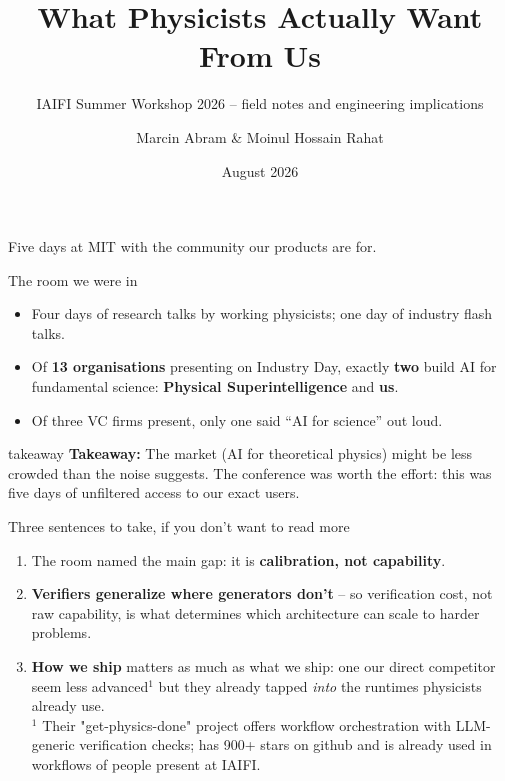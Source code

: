 \documentclass[aspectratio=169,11pt]{beamer}
\title{\textbf{What Physicists Actually Want From Us}}
\subtitle{IAIFI Summer Workshop 2026 -- field notes and engineering implications}
\author{Marcin Abram \& Moinul Hossain Rahat}
\institute{FirstPrinciples}
\date{August 2026}
\newcommand{\takeaway}[1]{%
  \vfill
  \begin{beamercolorbox}[wd=\textwidth,sep=0.45em]{takeaway}
    \small\textbf{Takeaway:} #1
  \end{beamercolorbox}%
}
\newcommand{\lead}[1]{\textcolor{fpaccent}{\textbf{#1}}}
\newcommand{\src}[1]{{\color{fpgray}\scriptsize #1}}
\begin{document}
\begin{frame}[plain]
  \titlepage
  \begin{center}
    \src{Five days at MIT with the community our products are for.}
  \end{center}
\end{frame}

\begin{frame}{The room we were in}
  \begin{itemize}\setlength\itemsep{0.7em}
    \item Four days of research talks by working physicists; one day of industry flash talks.
    \item Of \textbf{13 organisations} presenting on Industry Day, exactly \textbf{two} build AI for fundamental science: \textbf{Physical Superintelligence} and \textbf{us}.
    \item Of three VC firms present, only one said ``AI for science'' out loud.
  \end{itemize}
  \takeaway{The market (AI for theoretical physics) might be less crowded than the noise suggests. The conference was worth the effort: this was five days of unfiltered access to our exact users.}
\end{frame}

\begin{frame}{Three sentences to take, if you don't want to read more}
  \begin{enumerate}\setlength\itemsep{1.0em}
    \item The room named the main gap: it is \lead{calibration, not capability}.
    \item \lead{Verifiers generalize where generators don't} -- so verification cost, not raw capability, is what determines which architecture can scale to harder problems.
    \item \lead{How we ship} matters as much as what we ship: one our direct competitor seem less advanced$^1$ but they already tapped \emph{into} the runtimes physicists already use.\\[24pt]
    {\footnotesize $^1$ Their "get-physics-done" project offers workflow orchestration with LLM-generic verification checks; has 900+ stars on github and is already used in workflows of people present at IAIFI.}
  \end{enumerate}
  \vfill
\end{frame}
\end{document}
